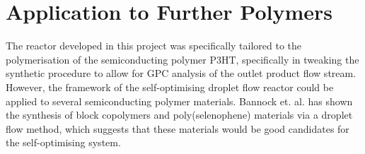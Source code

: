 \section{Application to Further Polymers}

The reactor developed in this project was specifically tailored to the polymerisation of the semiconducting polymer P3HT, specifically in tweaking the synthetic procedure to allow for GPC analysis of the outlet product flow stream. However, the framework of the self-optimising droplet flow reactor could be applied to several semiconducting polymer materials. Bannock et. al. has shown the synthesis of block copolymers and poly(selenophene) materials via a droplet flow method, which suggests that these materials would be good candidates for the self-optimising system.  
